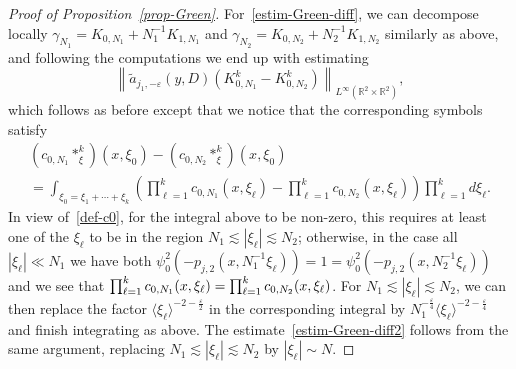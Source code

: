 \documentclass[AHL,Unicode,longabstracts,published]{cedram}
\newcommand{\R}{\mathbb{R}}
\newcommand{\eps}{\varepsilon}
\newcommand{\wt}{\widetilde}
\newcommand{\les}{\lesssim}
\newcommand{\jb}[1] {\langle #1 \rangle}
\begin{document}
\begin{proof}[Proof of Proposition~\ref{prop-Green}]
For~\eqref{estim-Green-diff}, we can decompose locally $\gamma_{N_1}=K_{0,N_1}+N_1^{-1}K_{1,N_1}$ and $\gamma_{N_2}=K_{0,N_2}+N_2^{-1}K_{1,N_2}$ similarly as above, and following the computations we end up with estimating
\begin{equation*}
\left\|\wt a_{j_1,-\eps}(y,D)\left(K_{0,N_1}^k-K_{0,N_2}^k\right)\right\|_{L^{\infty}(\R^2\times\R^2)},
\end{equation*}
which follows as before except that we notice that the corresponding symbols satisfy
\begin{multline*}
\left(c_{0,N_1}*_{\xi}^k\right)(x,\xi_0)-\left(c_{0,N_2}*_{\xi}^k\right)(x,\xi_0)\\
 = \int_{\xi_0=\xi_1+\cdots+\xi_k}\left(\prod_{\ell=1}^k c_{0,N_1}(x,\xi_\ell)-\prod_{\ell=1}^k c_{0,N_2}(x,\xi_\ell)\right)\prod_{\ell=1}^kd\xi_\ell.
\end{multline*}
In view of~\eqref{def-c0}, for the integral above to be non-zero, this requires at least one of the $\xi_\ell$ to be in the region $N_1\les |\xi_\ell|\les N_2$; otherwise, in the case all $|\xi_\ell|\ll N_1$ we have both $\psi_0^2(-p_{j,2}(x,N_1^{-1}\xi_\ell))=1=\psi_0^2(-p_{j,2}(x,N_2^{-1}\xi_\ell))$ and we see that $\prod_{\ell=1}^k c_{0,N_1}(x,\xi_\ell)\linebreak=\prod_{\ell=1}^k c_{0,N_2}(x,\xi_\ell)$. For $N_1\les |\xi_\ell|\les N_2$, we can then replace the factor $\jb{\xi_\ell}^{-2-\frac{\eps}2}$ in the corresponding integral by $N_1^{-\frac{\eps}4}\jb{\xi_\ell}^{-2-\frac{\eps}4}$ and finish integrating as above. The estimate~\eqref{estim-Green-diff2} follows from the same argument, replacing $N_1\les |\xi_\ell|\les N_2$ by $|\xi_\ell|\sim N$.
\end{proof}
\end{document}
